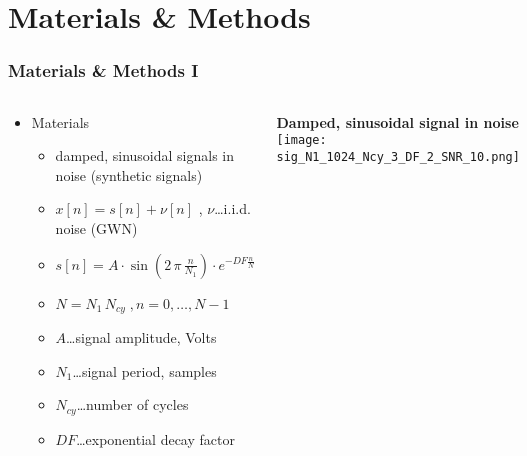 \documentclass[11pt,aspectratio=169]{beamer}
\begin{document}
	\section{Materials \& Methods}
	\begin{frame}
		\frametitle{Materials \& Methods I}
		\begin{columns}
			\begin{RIPcolleft}
				\begin{itemize}
					\setlength\itemsep{0.5em}
					\item \textcolor{RIPtitlecol}{Materials}
					\begin{itemize}
						\setlength\itemsep{0.5em}
						\item damped, sinusoidal signals in noise (synthetic signals)
						\item $x[n] = s[n] + \nu[n]$ , $\nu$\ldots i.i.d. noise (GWN)
						\item $s[n] = A \cdot \sin(2 \, \pi \, \frac{n}{N_1}) \cdot e^{-DF \frac{n}{N}}$
						\item $N = N_1 \, N_{cy} \; , n = 0,\ldots,N-1$
						\item $A$\ldots signal amplitude, Volts
						\item $N_1$\ldots signal period, samples
						\item $N_{cy}$\ldots number of cycles
						\item $DF$\ldots exponential decay factor
					\end{itemize}
				\end{itemize}
			\end{RIPcolleft}
			\begin{RIPcolright}
				\textbf{Damped, sinusoidal signal in noise}\\
				\vspace{1em}
				\texttt{[image: sig\_N1\_1024\_Ncy\_3\_DF\_2\_SNR\_10.png]}
			\end{RIPcolright}
		\end{columns}
	\end{frame}
\end{document}
